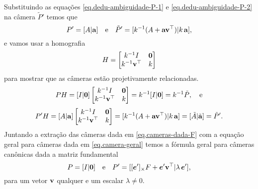 Substituindo as equações \ref{eq.dedu-ambiguidade-P-1} e \ref{eq.dedu-ambiguidade-P-2} na câmera $\tilde{P}'$ temos que 
\begin{equation}\label{eq.camera-geral}
P'=[A|{\bf a}]\quad\text{e}\quad \tilde{P}'=[k^{-1}(A+{\bf a}{\bf v}^\top)|k\,{\bf a}],
\end{equation}
e vamos usar a homografia
\begin{equation*}
H=
\begin{bmatrix}
k^{-1}I&{\bf 0}\\
k^{-1}{\bf v}^\top&k
\end{bmatrix}
\end{equation*}
para mostrar que as câmeras estão projetivamente relacionadas.
\begin{equation*}
PH=[I|{\bf 0}]
\begin{bmatrix}
k^{-1}I&{\bf 0}\\
k^{-1}{\bf v}^\top&k
\end{bmatrix}
=
k^{-1}[I|{\bf 0}]=k^{-1}\tilde{P},\quad\text{e}
\end{equation*}
\begin{equation*}
P'H=[A|{\bf a}]
\begin{bmatrix}
k^{-1}I&{\bf 0}\\
k^{-1}{\bf v}^\top&k
\end{bmatrix}
=
[k^{-1}(A+{\bf a}{\bf v}^\top)|k\,{\bf a}]
=[\tilde{A}|\tilde{{\bf a}}]=\tilde{P}'.
\end{equation*}
Juntando a extração das câmeras dada em \ref{eq.cameras-dada-F} com a equação geral para câmeras dada em \ref{eq.camera-geral} temos a fórmula geral para câmeras canônicas dada a matriz fundamental
\begin{equation*}
P=[I|{\bf 0}]\quad\text{e}\quad P'=[[\boldsymbol{e}']_\times F+\boldsymbol{e}'{\bf v}^\top |\lambda\,\boldsymbol{e}'],
\end{equation*} 
para um vetor ${\bf v}$ qualquer  e um escalar $\lambda\neq0$.

